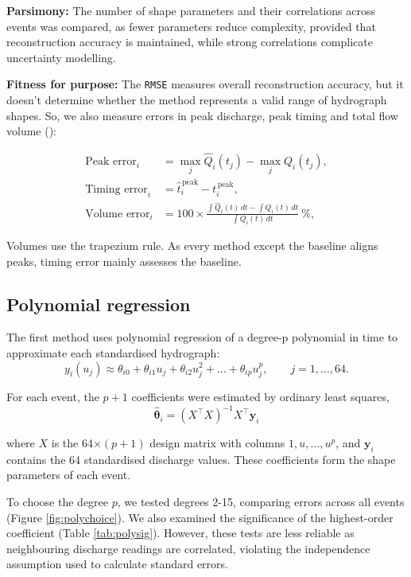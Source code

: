 \documentclass[
  11pt,
  a4paper]{article}
\begin{document}
\textbf{Parsimony:} The number of shape parameters and their correlations across events was compared, as fewer parameters reduce complexity, provided that reconstruction accuracy is maintained, while strong correlations complicate uncertainty modelling.

\textbf{Fitness for purpose:} The \texttt{RMSE} measures overall reconstruction accuracy, but it doesn't determine whether the method represents a valid range of hydrograph shapes. So, we also measure errors in peak discharge, peak timing and total flow volume ():

\begin{align}
\text{Peak error}_i &= \max_j \hat{Q}_i(t_j) - \max_j Q_i(t_j), \label{eq:peak}\\
\text{Timing error}_i &= \hat{t}_{i}^{\,\text{peak}} - t_{i}^{\,\text{peak}}, \label{eq:timing}\\
\text{Volume error}_i &= 100 \times \frac{\int \hat{Q}_i(t)\,dt - \int Q_i(t)\,dt}{\int Q_i(t)\,dt}\ \%, \label{eq:volume}
\end{align}

Volumes use the trapezium rule. As every method except the baseline aligns peaks, timing error mainly assesses the baseline.

\subsection{Polynomial regression}\label{method-polynomial}

The first method uses polynomial regression of a degree-p polynomial in time to approximate each standardised hydrograph:
\begin{equation}
y_i(u_j) \approx \theta_{i0} + \theta_{i1}u_j + \theta_{i2}u_j^2 + \dots + \theta_{ip}u_j^p, \qquad j = 1, \dots, 64.
\label{eq:poly}
\end{equation}

For each event, the \(p+1\) coefficients were estimated by ordinary least squares,
\begin{equation}
\hat{\boldsymbol{\theta}}_i = (X^\top X)^{-1} X^\top \mathbf{y}_i
\label{eq:OLS}
\end{equation}

where \(X\) is the 64\(\times(p+1)\) design matrix with columns \(1,u,\ldots,u^p\), and \(\mathbf{y}_i\) contains the 64 standardised discharge values. These coefficients form the shape parameters of each event.

To choose the degree \(p\), we tested degrees 2-15, comparing errors across all events (Figure \ref{fig:polychoice}). We also examined the significance of the highest-order coefficient (Table \ref{tab:polysig}). However, these tests are less reliable as neighbouring discharge readings are correlated, violating the independence assumption used to calculate standard errors.
\end{document}
